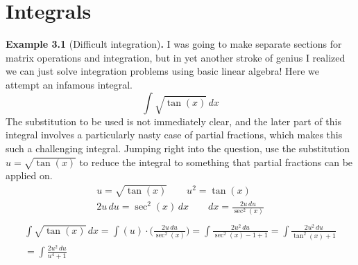 \documentclass{article}
\theoremstyle{definition}
\begin{document}
\section{Integrals}
\noindent\textbf{Example 3.1 }(Difficult integration)\textbf{.}
I was going to make separate sections for matrix operations and integration, but in yet
another stroke of genius I realized we can just solve integration problems using basic
linear algebra! Here we attempt an infamous integral.
\begin{equation*}
    \int\!\sqrt{\tan(x)}\,dx
\end{equation*}
The substitution to be used is not immediately clear, and the later part of this integral
involves a particularly nasty case of partial fractions, which makes this such a 
challenging integral. Jumping right into the question, use the substitution $u = \sqrt{\tan(x)}$
to reduce the integral to something that partial fractions can be applied on.
\begin{equation*}
\begin{split}
    u = \sqrt{\tan(x)} \qquad u^2 = \tan(x)\\
    2u\,du = \sec^2(x)\,dx \qquad dx = \frac{2u\,du}{\sec^2(x)} \\
\end{split}
\end{equation*}
\begin{equation*}
\begin{gathered}
    \int\!\sqrt{\tan(x)}\,dx = \int (u)\cdot \big(\frac{2u\,du}{\sec^2(x)}\big) 
    = \int\!\frac{2u^2\,du}{\sec^2(x)-1+1} = \int\!\frac{2u^2\,du}{\tan^2(x)+1}\\
    = \int\!\frac{2u^2\,du}{u^4+1}
\end{gathered}
\end{equation*}
\end{document}
